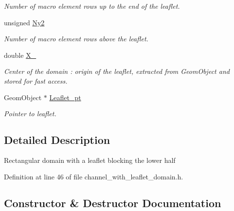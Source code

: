 \begin{DoxyCompactItemize}
\begin{DoxyCompactList}\small\item\em Number of macro element rows up to the end of the leaflet. \end{DoxyCompactList}\item 
unsigned \hyperlink{classoomph_1_1ChannelWithLeafletDomain_a1596a538b4263b42d20f9c098c5f2752}{Ny2}
\begin{DoxyCompactList}\small\item\em Number of macro element rows above the leaflet. \end{DoxyCompactList}\item 
double \hyperlink{classoomph_1_1ChannelWithLeafletDomain_a165703af81538c28bbbd780d65bbb333}{X\+\_}
\begin{DoxyCompactList}\small\item\em Center of the domain \+: origin of the leaflet, extracted from Geom\+Object and stored for fast access. \end{DoxyCompactList}\item 
Geom\+Object $\ast$ \hyperlink{classoomph_1_1ChannelWithLeafletDomain_a08a8eb7078cdc788dc7643e09e7405fb}{Leaflet\+\_\+pt}
\begin{DoxyCompactList}\small\item\em Pointer to leaflet. \end{DoxyCompactList}\end{DoxyCompactItemize}


\subsection{Detailed Description}
Rectangular domain with a leaflet blocking the lower half 

Definition at line 46 of file channel\+\_\+with\+\_\+leaflet\+\_\+domain.\+h.



\subsection{Constructor \& Destructor Documentation}
\mbox{\label{classoomph_1_1ChannelWithLeafletDomain_a6cca7d06136de0c76facec2a92b0939e}} 

